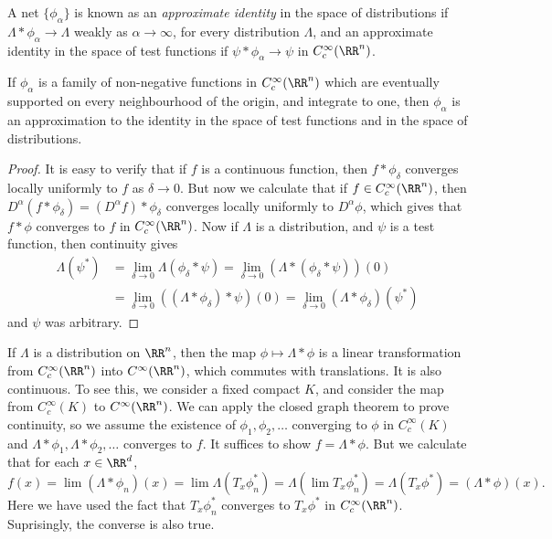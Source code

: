 A net $\{ \phi_\alpha \}$ is known as an {\it approximate identity} in the space of distributions if $\Lambda * \phi_\alpha \to \Lambda$ weakly as $\alpha \to \infty$, for every distribution $\Lambda$, and an approximate identity in the space of test functions if $\psi * \phi_\alpha \to \psi$ in $C_c^\infty(\RR^n)$.

\begin{theorem}
    If $\phi_\alpha$ is a family of non-negative functions in $C_c^\infty(\RR^n)$ which are eventually supported on every neighbourhood of the origin, and integrate to one, then $\phi_\alpha$ is an approximation to the identity in the space of test functions and in the space of distributions.
\end{theorem}
\begin{proof}
    It is easy to verify that if $f$ is a continuous function, then $f * \phi_\delta$ converges locally uniformly to $f$ as $\delta \to 0$. But now we calculate that if $f \in C_c^\infty(\RR^n)$, then $D^\alpha(f * \phi_\delta) = (D^\alpha f) * \phi_\delta$ converges locally uniformly to $D^\alpha \phi$, which gives that $f * \phi$ converges to $f$ in $C_c^\infty(\RR^n)$. Now if $\Lambda$ is a distribution, and $\psi$ is a test function, then continuity gives
    \begin{align*}
        \Lambda(\psi^*) &= \lim_{\delta \to 0} \Lambda(\phi_\delta * \psi) = \lim_{\delta \to 0} (\Lambda * (\phi_\delta * \psi))(0)\\
        &= \lim_{\delta \to 0} ((\Lambda * \phi_\delta) * \psi)(0) = \lim_{\delta \to 0} (\Lambda * \phi_\delta)(\psi^*)
    \end{align*}
    and $\psi$ was arbitrary.
\end{proof}

If $\Lambda$ is a distribution on $\RR^n$, then the map $\phi \mapsto \Lambda * \phi$ is a linear transformation from $C_c^\infty(\RR^n)$ into $C^\infty(\RR^n)$, which commutes with translations. It is also continuous. To see this, we consider a fixed compact $K$, and consider the map from $C_c^\infty(K)$ to $C^\infty(\RR^n)$. We can apply the closed graph theorem to prove continuity, so we assume the existence of $\phi_1, \phi_2, \dots$ converging to $\phi$ in $C_c^\infty(K)$ and $\Lambda * \phi_1, \Lambda * \phi_2, \dots$ converges to $f$. It suffices to show $f = \Lambda * \phi$. But we calculate that for each $x \in \RR^d$,
%
\[ f(x) = \lim (\Lambda * \phi_n)(x) = \lim \Lambda(T_x \phi^*_n) = \Lambda (\lim T_x \phi^*_n) = \Lambda(T_x \phi^*) = (\Lambda * \phi)(x). \]
%
Here we have used the fact that $T_x \phi_n^*$ converges to $T_x \phi^*$ in $C_c^\infty(\RR^n)$. Suprisingly, the converse is also true.

